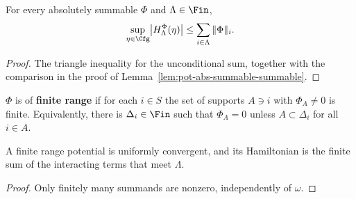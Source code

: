 \begin{theorem}[Georgii (2.14)]
    \label{thm:pot-hamiltonian-bound}
    \leanok{}

    For every absolutely summable $\Phi$ and $\Lambda\in\Fin$,
    \[
      \sup_{\eta\in\Cfg}\bigl|H_\Lambda^\Phi(\eta)\bigr|
        \le\sum_{i\in\Lambda}\|\Phi\|_i.
    \]
\end{theorem}
\begin{proof}
    \leanok{}

    The triangle inequality for the unconditional sum, together with the comparison in the
    proof of Lemma~\ref{lem:pot-abs-summable-summable}.
\end{proof}

\begin{definition}
    \label{def:pot-finite-range}
    \leanok{}

    $\Phi$ is of \textbf{finite range} if for each $i\in S$ the set of supports $A\ni i$ with
    $\Phi_A\neq 0$ is finite. Equivalently, there is $\Delta_i\in\Fin$ such that $\Phi_A=0$
    unless $A\subset\Delta_i$ for all $i\in A$.
\end{definition}

\begin{lemma}
    \label{lem:pot-finite-range-summable}
    \leanok{}

    A finite range potential is uniformly convergent, and its Hamiltonian is the finite sum
    of the interacting terms that meet $\Lambda$.
\end{lemma}
\begin{proof}
    \leanok{}

    Only finitely many summands are nonzero, independently of $\omega$.
\end{proof}

